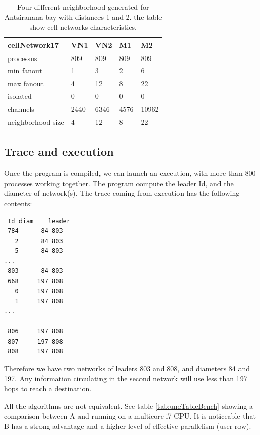 \begin{table}[htb]
\begin{center}
\begin{tabular}{|l|l|l|l|l||}\hline
cellNetwork17 & VN1 &   VN2 &   M1 &    M2\\\hline
processus  &    809 &   809 &   809 &   809\\\hline
min fanout  &   1 &     3 &     2 &     6\\\hline
max fanout  &   4 &     12 &    8 &     22\\\hline
isolated    &   0 &     0 &     0 &     0\\\hline
channels    &   2440 &  6346 &  4576 &  10962\\\hline
neighborhood size  &   4 &  12 &  8 &  22\\\hline
\end{tabular}
\caption{ Four different neighborhood generated for Antsiranana bay with distances 1 and 2.
the table show  cell  networks characteristics. }
\label{tab:uneCATable}
\end{center}
\end{table}


\subsection{ Trace and execution }
\label{sec:antsiranan}

Once the program is compiled, we can launch an execution, with more than 800 processes
working together. The program compute the leader Id, and the diameter of network(s).
The trace coming from execution has the following contents:

\begin{lstlisting}
 Id	diam	leader
 784	  84 803
   2	  84 803
   5	  84 803
...
 803	  84 803
 668	 197 808
   0	 197 808
   1	 197 808
...

 806	 197 808
 807	 197 808
 808	 197 808
\end{lstlisting}

Therefore we have two networks of leaders 803 and 808, and diameters 84 and 197.
Any information circulating in the second network will use less than 197 hops to
reach a destination.

All the algorithms  are not equivalent. See table \ref{tab:uneTableBench} showing a comparison between A and 
running on a multicore i7 CPU. It is noticeable that B has a strong advantage and a higher level
of effective parallelism (user row).


